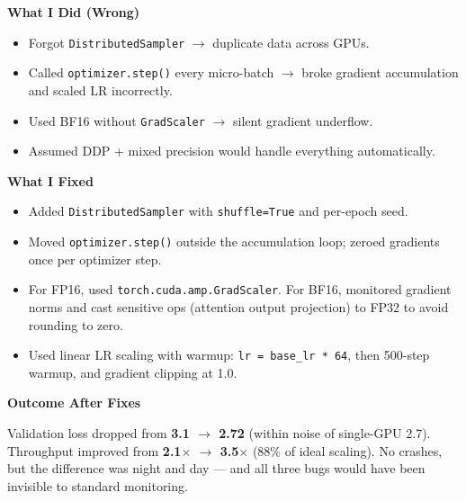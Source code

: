 \documentclass[11pt]{article}
\begin{document}
\vspace{0.2in}

\begin{minipage}[t]{0.48\textwidth}
    {\large\color{brandred}\textbf{What I Did (Wrong)}}

    \begin{itemize}[leftmargin=*, itemsep=0.06in, label={\color{brandred}\textbullet}]
        \item Forgot \texttt{DistributedSampler} $\rightarrow$ duplicate data across GPUs.
        \item Called \texttt{optimizer.step()} every micro-batch $\rightarrow$ broke gradient accumulation and scaled LR incorrectly.
        \item Used BF16 without \texttt{GradScaler} $\rightarrow$ silent gradient underflow.
        \item Assumed DDP + mixed precision would handle everything automatically.
        
    \end{itemize}
\end{minipage}
\hfill
\begin{minipage}[t]{0.48\textwidth}
    {\large\color{brandgreen}\textbf{What I Fixed}}

    \begin{itemize}[leftmargin=*, itemsep=0.06in, label={\color{brandgreen}\textbullet}]
        \item Added \texttt{DistributedSampler} with \texttt{shuffle=True} and per-epoch seed.
        \item Moved \texttt{optimizer.step()} outside the accumulation loop; zeroed gradients once per optimizer step.
        \item For FP16, used \texttt{torch.cuda.amp.GradScaler}. For BF16, monitored gradient norms and cast sensitive ops (attention output projection) to FP32 to avoid rounding to zero.
        \item Used linear LR scaling with warmup: \texttt{lr = base\_lr * 64}, then 500-step warmup, and gradient clipping at 1.0.
    \end{itemize}
\end{minipage}

\vspace{0.2in}

\begin{darkbox}
{\large\textbf{Outcome After Fixes}}

\vspace{0.05in}
Validation loss dropped from \textbf{3.1 $\rightarrow$ 2.72} (within noise of single-GPU 2.7). Throughput improved from \textbf{2.1$×$ $\rightarrow$ 3.5$×$} (88\% of ideal scaling). No crashes, but the difference was night and day — and all three bugs would have been invisible to standard monitoring.
\end{darkbox}
\end{document}
